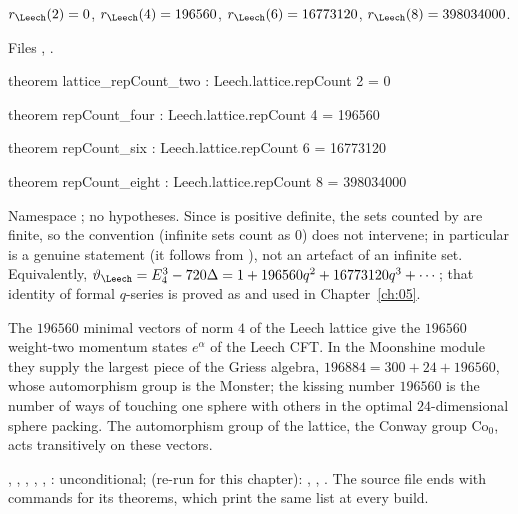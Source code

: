 \begin{theorem}\label{ch02:thm:196560}
$r_\Leech(2)=0$, $r_\Leech(4)=196560$, $r_\Leech(6)=16773120$, $r_\Leech(8)=398034000$.
\end{theorem}
\noindent Files , .
\begin{leancode}
theorem lattice_repCount_two : Leech.lattice.repCount 2 = 0

theorem repCount_four : Leech.lattice.repCount 4 = 196560

theorem repCount_six : Leech.lattice.repCount 6 = 16773120

theorem repCount_eight : Leech.lattice.repCount 8 = 398034000
\end{leancode}
\begin{dictionary}
Namespace ; no hypotheses.  Since  is positive definite, the sets
counted by  are finite, so the  convention (infinite sets count as $0$)
does not intervene; in particular  is a genuine statement (it follows
from ), not an artefact of an infinite set.  Equivalently,
$\vartheta_\Leech=E_4^3-720\Delta=1+196560q^2+16773120q^3+\cdots$; that identity of formal
$q$-series is proved as  and used in
Chapter~\ref{ch:05}.
\end{dictionary}
\begin{physics}
The $196560$ minimal vectors of norm $4$ of the Leech lattice give the $196560$ weight-two momentum states $e^{\alpha}$ of the Leech CFT. In the Moonshine module they supply the largest piece of the Griess algebra, $196884=300+24+196560$, whose automorphism group is the Monster; the kissing number $196560$ is the number of ways of touching one sphere with others in the optimal $24$-dimensional sphere packing. The automorphism group of the lattice, the Conway group $\mathrm{Co}_0$, acts transitively on these vectors.
\end{physics}
\begin{status}
, , ,
, ,
: unconditional; 
(re-run for this chapter): , , .  The source
file  ends with  commands for its theorems,
which print the same list at every build.
\end{status}

